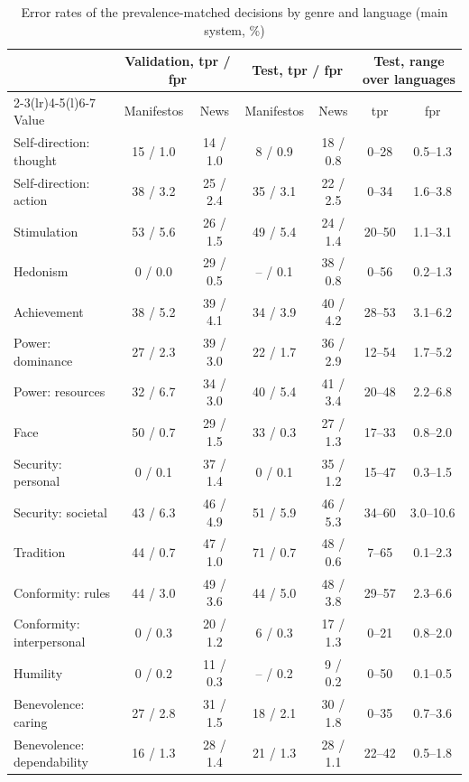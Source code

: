 \begin{table}[t]
\caption{Error rates of the prevalence-matched decisions by genre and language (main system, \%)}
\label{tab:error-rates}
\centering
\scriptsize
\setlength{\tabcolsep}{3pt}
\begin{tabular*}{\textwidth}{@{\extracolsep{\fill}}lcccccc@{}}
\toprule
 & \multicolumn{2}{c}{Validation, tpr / fpr} & \multicolumn{2}{c}{Test, tpr / fpr} & \multicolumn{2}{c}{Test, range over languages} \\
\cmidrule(lr){2-3}\cmidrule(lr){4-5}\cmidrule(l){6-7}
Value & Manifestos & News & Manifestos & News & tpr & fpr \\
\midrule
Self-direction: thought & 15 / 1.0 & 14 / 1.0 & 8 / 0.9 & 18 / 0.8 & 0--28 & 0.5--1.3 \\
Self-direction: action & 38 / 3.2 & 25 / 2.4 & 35 / 3.1 & 22 / 2.5 & 0--34 & 1.6--3.8 \\
Stimulation & 53 / 5.6 & 26 / 1.5 & 49 / 5.4 & 24 / 1.4 & 20--50 & 1.1--3.1 \\
Hedonism & 0 / 0.0 & 29 / 0.5 & -- / 0.1 & 38 / 0.8 & 0--56 & 0.2--1.3 \\
Achievement & 38 / 5.2 & 39 / 4.1 & 34 / 3.9 & 40 / 4.2 & 28--53 & 3.1--6.2 \\
Power: dominance & 27 / 2.3 & 39 / 3.0 & 22 / 1.7 & 36 / 2.9 & 12--54 & 1.7--5.2 \\
Power: resources & 32 / 6.7 & 34 / 3.0 & 40 / 5.4 & 41 / 3.4 & 20--48 & 2.2--6.8 \\
Face & 50 / 0.7 & 29 / 1.5 & 33 / 0.3 & 27 / 1.3 & 17--33 & 0.8--2.0 \\
Security: personal & 0 / 0.1 & 37 / 1.4 & 0 / 0.1 & 35 / 1.2 & 15--47 & 0.3--1.5 \\
Security: societal & 43 / 6.3 & 46 / 4.9 & 51 / 5.9 & 46 / 5.3 & 34--60 & 3.0--10.6 \\
Tradition & 44 / 0.7 & 47 / 1.0 & 71 / 0.7 & 48 / 0.6 & 7--65 & 0.1--2.3 \\
Conformity: rules & 44 / 3.0 & 49 / 3.6 & 44 / 5.0 & 48 / 3.8 & 29--57 & 2.3--6.6 \\
Conformity: interpersonal & 0 / 0.3 & 20 / 1.2 & 6 / 0.3 & 17 / 1.3 & 0--21 & 0.8--2.0 \\
Humility & 0 / 0.2 & 11 / 0.3 & -- / 0.2 & 9 / 0.2 & 0--50 & 0.1--0.5 \\
Benevolence: caring & 27 / 2.8 & 31 / 1.5 & 18 / 2.1 & 30 / 1.8 & 0--35 & 0.7--3.6 \\
Benevolence: dependability & 16 / 1.3 & 28 / 1.4 & 21 / 1.3 & 28 / 1.1 & 22--42 & 0.5--1.8 \\

\end{tabular*}
\end{table}
